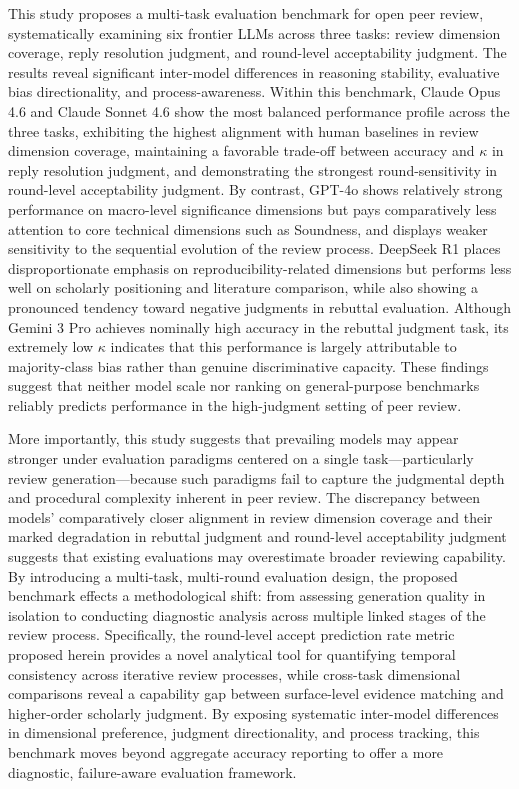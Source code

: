 \documentclass[preprint,10pt,times]{elsarticle}
\begin{document}
This study proposes a multi-task evaluation benchmark for open peer review, systematically examining six frontier LLMs across three tasks: review dimension coverage, reply resolution judgment, and round-level acceptability judgment. The results reveal significant inter-model differences in reasoning stability, evaluative bias directionality, and process-awareness. Within this benchmark, Claude Opus 4.6 and Claude Sonnet 4.6 show the most balanced performance profile across the three tasks, exhibiting the highest alignment with human baselines in review dimension coverage, maintaining a favorable trade-off between accuracy and $\kappa$ in reply resolution judgment, and demonstrating the strongest round-sensitivity in round-level acceptability judgment. By contrast, GPT-4o shows relatively strong performance on macro-level significance dimensions but pays comparatively less attention to core technical dimensions such as Soundness, and displays weaker sensitivity to the sequential evolution of the review process. DeepSeek R1 places disproportionate emphasis on reproducibility-related dimensions but performs less well on scholarly positioning and literature comparison, while also showing a pronounced tendency toward negative judgments in rebuttal evaluation. Although Gemini 3 Pro achieves nominally high accuracy in the rebuttal judgment task, its extremely low $\kappa$ indicates that this performance is largely attributable to majority-class bias rather than genuine discriminative capacity. These findings suggest that neither model scale nor ranking on general-purpose benchmarks reliably predicts performance in the high-judgment setting of peer review.

More importantly, this study suggests that prevailing models may appear stronger under evaluation paradigms centered on a single task---particularly review generation---because such paradigms fail to capture the judgmental depth and procedural complexity inherent in peer review. The discrepancy between models' comparatively closer alignment in review dimension coverage and their marked degradation in rebuttal judgment and round-level acceptability judgment suggests that existing evaluations may overestimate broader reviewing capability. By introducing a multi-task, multi-round evaluation design, the proposed benchmark effects a methodological shift: from assessing generation quality in isolation to conducting diagnostic analysis across multiple linked stages of the review process. Specifically, the round-level accept prediction rate metric proposed herein provides a novel analytical tool for quantifying temporal consistency across iterative review processes, while cross-task dimensional comparisons reveal a capability gap between surface-level evidence matching and higher-order scholarly judgment. By exposing systematic inter-model differences in dimensional preference, judgment directionality, and process tracking, this benchmark moves beyond aggregate accuracy reporting to offer a more diagnostic, failure-aware evaluation framework.
\end{document}
